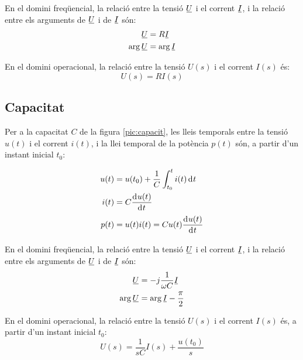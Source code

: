 En el domini freqüencial, la relació entre
la tensió $\cmplx{U}$ i el corrent $\cmplx{I}$, i la relació entre els arguments de $\cmplx{U}$ i de $\cmplx{I}$ són:
\begin{align}
	\cmplx{U} &= R \cmplx{I} \\ \arg{\cmplx{U}} &= \arg{\cmplx{I}}
\end{align}

 En el domini operacional, la relació entre la tensió $U(s)$ i el corrent $I(s)$ és:
\begin{equation}
	U(s) = R I(s)
\end{equation}

\subsection{Capacitat} 

Per a la capacitat $C$ de la figura
\vref{pic:capacit}, les lleis temporals entre la tensió $u(t)$ i el
corrent $i(t)$, i la llei temporal de la potència $p(t)$ són, a partir d'un instant inicial $t_0$:

\hfill
\begin{minipage}[b]{5cm}
	
	\label{pic:capacit}
\end{minipage}
\hfill
\begin{minipage}[b][3.8cm][t]{8cm}
	\begin{align}
		u(t) &= u(t_0) + \frac{1}{C} \int_{t_0}^t i(t) \diff t \\
		i(t) &= C \deriv{u(t)}{t} \\
		p(t) &= u(t) i(t) = C u(t) \deriv{u(t)}{t}
	\end{align}
\end{minipage}

En el domini freqüencial, la relació entre la tensió $\cmplx{U}$ i el corrent $\cmplx{I}$, i la relació entre els arguments de $\cmplx{U}$ i de $\cmplx{I}$  són:
\begin{align}
	\cmplx{U} &= -j \frac{1}{\omega C} \cmplx{I} \\
	\arg{\cmplx{U}} &= \arg{\cmplx{I}} - \frac{\pi}{2}
\end{align}

En el domini operacional, la relació entre la tensió $U(s)$ i el corrent $I(s)$ és, a partir d'un instant inicial $t_0$:
\begin{equation}
	U(s) = \frac{1}{s C} I(s) + \frac{u(t_0)}{s}
\end{equation}


